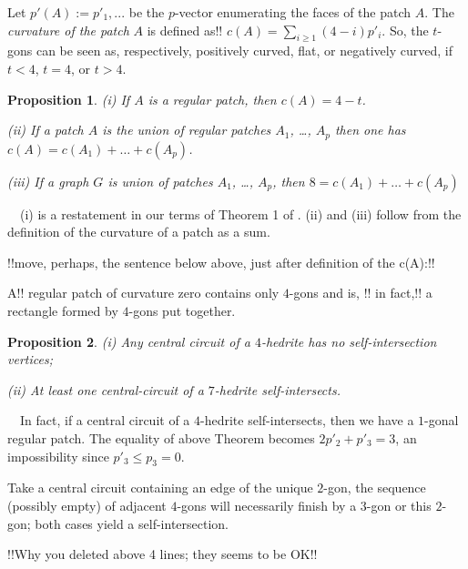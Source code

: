 \documentclass[12pt]{article}
\newtheorem{proposition}{Proposition}
\newcommand{\proof}{\noindent{\bf Proof.}\ \ }
\begin{document}
Let $p'(A):=p'_1,...$ be the $p$-vector enumerating the faces of the 
patch $A$. The {\em curvature of the patch} $A$ is defined as!!
$c(A)=\sum_{i\geq 1} (4-i)p'_i$. So, the $t$-gons can be seen as,
respectively, positively curved, flat, or negatively curved, if
$t<4$, $t=4$, or $t>4$.


\begin{proposition}\label{Local-Euler-Formula}
(i) If $A$ is a regular patch, then $c(A)=4-t$.

(ii) If a patch $A$ is the union of regular patches $A_1$, \dots, $A_p$ then one has $c(A)=c(A_1)+\dots+c(A_p)$.

(iii) If a graph $G$ is union of patches $A_1$, \dots, $A_p$, then $8=c(A_1)+\dots+c(A_p)$
\end{proposition}
\proof (i) is a restatement in our terms of Theorem 1 of \cite{DSt}. (ii) and (iii) follow from the definition of the curvature of a patch as a sum.



!!move, perhaps, the sentence below above, just after definition of the 
c(A):!!

A!! regular patch of curvature zero contains only $4$-gons and is,
!! in fact,!! 
a rectangle formed by $4$-gons put together.


\begin{proposition}
(i) Any central circuit of a $4$-hedrite has no self-intersection vertices;

(ii) At least one central-circuit of a $7$-hedrite self-intersects.
\end{proposition}
\proof In fact, if a central circuit of a $4$-hedrite self-intersects, then we have a $1$-gonal regular patch. The equality of above Theorem becomes $2p'_2+p'_3=3$, an impossibility since $p'_3\leq p_3=0$.

Take a central circuit containing an edge of the unique $2$-gon, the sequence (possibly empty) of adjacent $4$-gons will necessarily finish by a $3$-gon or this $2$-gon; both cases yield a self-intersection.






!!Why you deleted above 4 lines; they seems to be OK!!
\end{document}
